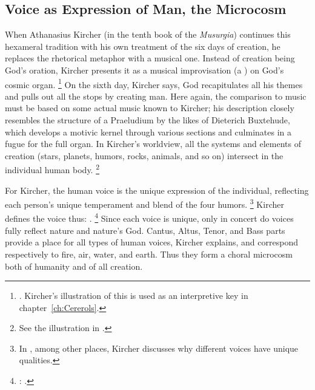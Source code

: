 \subsection{%
Voice as Expression of Man, the Microcosm
}

When Athanasius Kircher (in the tenth book of the \emph{Musurgia}) continues this hexameral tradition with his own treatment of the six days of creation, he replaces the rhetorical metaphor with a musical one.
Instead of creation being God's oration, Kircher presents it as a musical improvisation (a ) on God's cosmic organ.%
	\footnote{%
	\Autocite[Vol. 2, 366--367]{Kircher:Musurgia}.
	Kircher's illustration of this is used as an interpretive key in chapter~\ref{ch:Cererols}.
	}
On the sixth day, Kircher says, God recapitulates all his themes and pulls out all the stops by creating man.
Here again, the comparison to music must be based on some actual music known to Kircher; his description closely resembles the structure of a Praeludium by the likes of Dieterich Buxtehude, which develops a motivic kernel through various sections and culminates in a fugue for the full organ.
In Kircher's worldview, all the systems and elements of creation (stars, planets, humors, rocks, animals, and so on) intersect in the individual human body.%
	\footnote{%
	See the illustration in \autocite[vol. 2, 402]{Kircher:Musurgia}.
	}

For Kircher, the human voice is the unique expression of the individual, reflecting each person's unique temperament and blend of the four humors.%
	\footnote{%
	In , among other places, Kircher discusses why different voices have unique qualities.
	}
Kircher defines the voice thus: .%
	\footnote{%
	\Autocite[vol. 1, 20]{Kircher:Musurgia}: .
	}
Since each voice is unique, only in concert do voices fully reflect nature and nature's God.
Cantus, Altus, Tenor, and Bass parts provide a place for all types of human voices, Kircher explains, and correspond respectively to fire, air, water, and earth.
Thus they form a choral microcosm both of humanity and of all creation.%
	\Autocite[vol. 1, 217--219]{Kircher:Musurgia}


